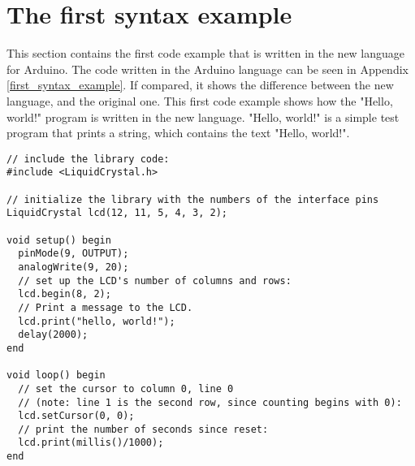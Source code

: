 \section{The first syntax example}
This section contains the first code example that is written in the new language for Arduino. The code written in the Arduino language can be seen in Appendix \ref{first_syntax_example}. If compared, it shows the difference between the new language, and the original one. This first code example shows how the "Hello, world!" program is written in the new language. "Hello, world!" is a simple test program that prints a string, which contains the text "Hello, world!".
 
\begin{lstlisting}[caption=Hello World code example based on the source language, label=lst:syntax1]
// include the library code:
#include <LiquidCrystal.h>

// initialize the library with the numbers of the interface pins
LiquidCrystal lcd(12, 11, 5, 4, 3, 2);

void setup() begin
  pinMode(9, OUTPUT);
  analogWrite(9, 20);
  // set up the LCD's number of columns and rows: 
  lcd.begin(8, 2);
  // Print a message to the LCD.
  lcd.print("hello, world!");
  delay(2000);
end

void loop() begin
  // set the cursor to column 0, line 0
  // (note: line 1 is the second row, since counting begins with 0):
  lcd.setCursor(0, 0);
  // print the number of seconds since reset:
  lcd.print(millis()/1000);
end
\end{lstlisting}
